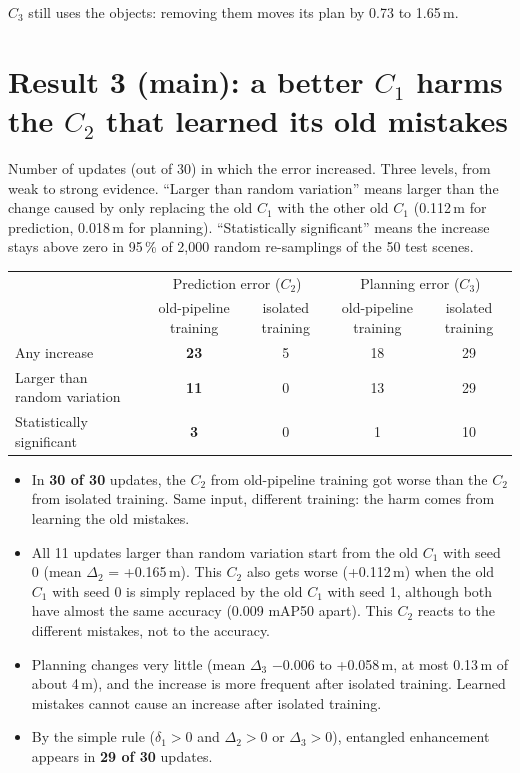 \documentclass[10pt,a4paper]{article}
\begin{document}
$C_3$ still uses the objects: removing them moves its plan by 0.73 to 1.65\,m.

\section*{Result 3 (main): a better $C_1$ harms the $C_2$ that learned its old mistakes}
Number of updates (out of 30) in which the error increased.
Three levels, from weak to strong evidence.
``Larger than random variation'' means larger than the change caused by only replacing the old $C_1$ with the other old $C_1$ (0.112\,m for prediction, 0.018\,m for planning).
``Statistically significant'' means the increase stays above zero in 95\,\% of 2{,}000 random re-samplings of the 50 test scenes.

\begin{tabular}{lcccc}\toprule
 & \multicolumn{2}{c}{Prediction error ($C_2$)} & \multicolumn{2}{c}{Planning error ($C_3$)}\\
 & old-pipeline training & isolated training & old-pipeline training & isolated training\\\midrule
Any increase & \textbf{23} & 5 & 18 & 29\\
Larger than random variation & \textbf{11} & 0 & 13 & 29\\
Statistically significant & \textbf{3} & 0 & 1 & 10\\\bottomrule
\end{tabular}

\begin{itemize}\setlength{\itemsep}{1pt}
\item In \textbf{30 of 30} updates, the $C_2$ from old-pipeline training got worse than the $C_2$ from isolated training. Same input, different training: the harm comes from learning the old mistakes.
\item All 11 updates larger than random variation start from the old $C_1$ with seed 0 (mean $\Delta_2$ = +0.165\,m). This $C_2$ also gets worse (+0.112\,m) when the old $C_1$ with seed 0 is simply replaced by the old $C_1$ with seed 1, although both have almost the same accuracy (0.009 mAP50 apart). This $C_2$ reacts to the different mistakes, not to the accuracy.
\item Planning changes very little (mean $\Delta_3$ $-$0.006 to +0.058\,m, at most 0.13\,m of about 4\,m), and the increase is more frequent after isolated training. Learned mistakes cannot cause an increase after isolated training.
\item By the simple rule ($\delta_1 > 0$ and $\Delta_2 > 0$ or $\Delta_3 > 0$), entangled enhancement appears in \textbf{29 of 30} updates.
\end{itemize}
\end{document}
